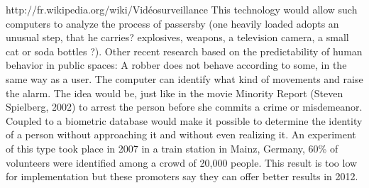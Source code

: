 http://fr.wikipedia.org/wiki/Vidéosurveillance
This technology would allow such computers to analyze the process of passersby (one heavily loaded adopts an unusual step, that he carries? explosives, weapons, a television camera, a small cat or soda bottles ?). Other recent research based on the predictability of human behavior in public spaces: A robber does not behave according to some, in the same way as a user. The computer can identify what kind of movements and raise the alarm. The idea would be, just like in the movie Minority Report (Steven Spielberg, 2002) to arrest the person before she commits a crime or misdemeanor.
Coupled to a biometric database would make it possible to determine the identity of a person without approaching it and without even realizing it. An experiment of this type took place in 2007 in a train station in Mainz, Germany, 60\% of volunteers were identified among a crowd of 20,000 people. This result is too low for implementation but these promoters say they can offer better results in 2012.

